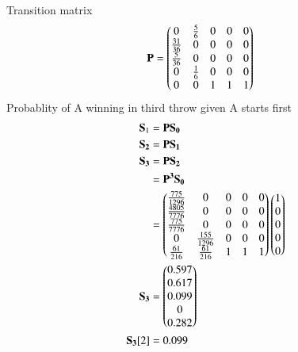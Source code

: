 \documentclass[book,11pt]{IEEEtran}
\begin{document}
Transition matrix\\
\begin{align}
\mathbf{P} &= \begin{pmatrix}
    0 & \frac{5}{6} & 0 & 0 & 0 \\
    \frac{31}{36} & 0 & 0 & 0 & 0 \\
    \frac{5}{36} & 0 & 0 & 0 & 0 \\
    0 & \frac{1}{6} & 0 & 0 & 0 \\
    0 & 0 & 1 & 1 & 1\\
\end{pmatrix}
\end{align}
Probablity of A winning in third throw given A starts first\\
\begin{align}
\mathbf{S}_1 &= \mathbf{P}\mathbf{S_0}\\
\mathbf{S_2} &= \mathbf{P}\mathbf{S_1}\\
\mathbf{S_3} &= \mathbf{P}\mathbf{S_2}\\
    &= \mathbf{P^3}\mathbf{S_0}\\
&= \begin{pmatrix}
    \frac{775}{1296} & 0 & 0 & 0 & 0 \\
    \frac{4805}{7776} & 0 & 0 & 0 & 0 \\
    \frac{775}{7776} & 0 & 0 & 0 & 0 \\
    0 & \frac{155}{1296} & 0 & 0 & 0 \\
    \frac{61}{216} & \frac{61}{216} & 1 & 1 & 1
\end{pmatrix}
\begin{pmatrix} 1\\ 0\\0\\0\\0\\\end{pmatrix}\\
\mathbf{S_3} &= \begin{pmatrix}0.597\\ 0.617\\0.099\\0\\0.282\end{pmatrix}\\
\mathbf{S_3}[2] &= 0.099
\end{align}
\end{document}
